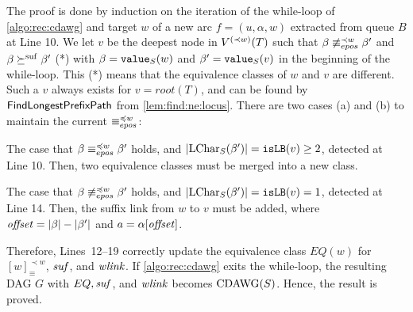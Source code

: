 \documentclass{article}
\begin{document}
\begin{proofsketch}
  The proof is done by induction on the iteration of the while-loop of \cref{algo:rec:cdawg} and target $w$ of a new arc $f = (u, \alpha, w)$ extracted from queue $B$ at Line 10. 
  We let $v$ be the deepest node in $V\rk{\prec w}(T)$ such that
  $\beta \not\eqepos[\prec w] \beta'$
  and $\beta \succeqsuf \beta'$ (*)
  with $\beta = \Value(w)$ and $\beta' = \Value(v)$ 
  in the beginning of the while-loop. This (*) means that the equivalence classes of $w$ and $v$ are different. 
  Such a $v$ always exists for $v = root(T)$, and 
  can be found by $\FindNonEquivLocus$ from \cref{lem:find:ne:locus}. 
  There are two cases (a) and (b) to maintain the current $\eqepos[\preceq w]$:
\begin{enumerate*}[(a)]
\item The case that $\beta \eqepos[\preceq w] \beta'$ holds, and $|\LChar(\beta')| = \op{isLB}(v) \ge 2$, detected at Line 10. Then, two equivalence classes must be merged into a new class. 
\item The case that $\beta \not\eqepos[\preceq w] \beta'$ holds, and $|\LChar(\beta')| = \op{isLB}(v) = 1$, detected at Line 14. Then, the suffix link from $w$ to $v$ must be added, where $\id{offset} = |\beta| - |\beta'|$ and $a = \alpha[\id{offset}]$. 
\end{enumerate*}
Therefore, Lines~12--19 correctly update the equivalence class $EQ(w)$ for $[w]^{\prec w}_{\equiv}$, $\id{suf}$, and $\id{wlink}$. If \cref{algo:rec:cdawg} exits the while-loop, the resulting DAG $G$ with $EQ, \id{suf}$, and $\id{wlink}$ becomes $\CDAWG(S)$. Hence, the result is proved. 
\end{proofsketch}
\end{document}
